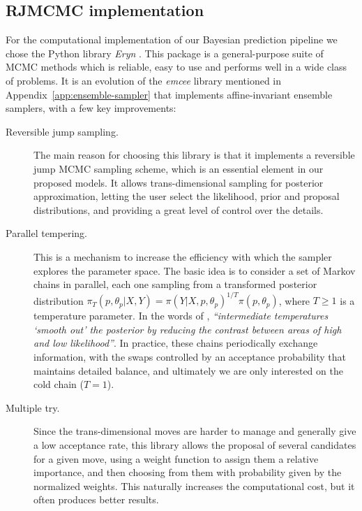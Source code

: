 \subsection{RJMCMC implementation}

For the computational implementation of our Bayesian prediction pipeline we chose the Python library \textit{Eryn} \citep{karnesis2023eryn}. This package is a general-purpose suite of MCMC methods which is reliable, easy to use and performs well in a wide class of problems. It is an evolution of the \textit{emcee} library mentioned in Appendix~\ref{app:ensemble-sampler} that implements affine-invariant ensemble samplers, with a few key improvements:

\begin{description}
  \item[Reversible jump sampling.] The main reason for choosing this library is that it implements a reversible jump MCMC sampling scheme, which is an essential element in our proposed models. It allows trans-dimensional sampling for posterior approximation, letting the user select the likelihood, prior and proposal distributions, and providing a great level of control over the details.

  \item[Parallel tempering.] This is a mechanism to increase the efficiency with which the sampler explores the parameter space. The basic idea is to consider a set of Markov chains in parallel, each one sampling from a transformed posterior distribution \(\pi_T(p, \theta_p|X,Y) = \pi(Y|X, p, \theta_p)^{1/T}\pi(p, \theta_p)\), where \(T\geq 1\) is a temperature parameter. In the words of \citet{karnesis2023eryn}, \textit{``intermediate temperatures `smooth out' the posterior by reducing the contrast between areas of high and low likelihood''}. In practice, these chains periodically exchange information, with the swaps controlled by an acceptance probability that maintains detailed balance, and ultimately we are only interested on the cold chain (\(T=1\)).

  \item[Multiple try.] Since the trans-dimensional moves are harder to manage and generally give a low acceptance rate, this library allows the proposal of several candidates for a given move, using a weight function to assign them a relative importance, and then choosing from them with probability given by the normalized weights. This naturally increases the computational cost, but it often produces better results.
\end{description}

